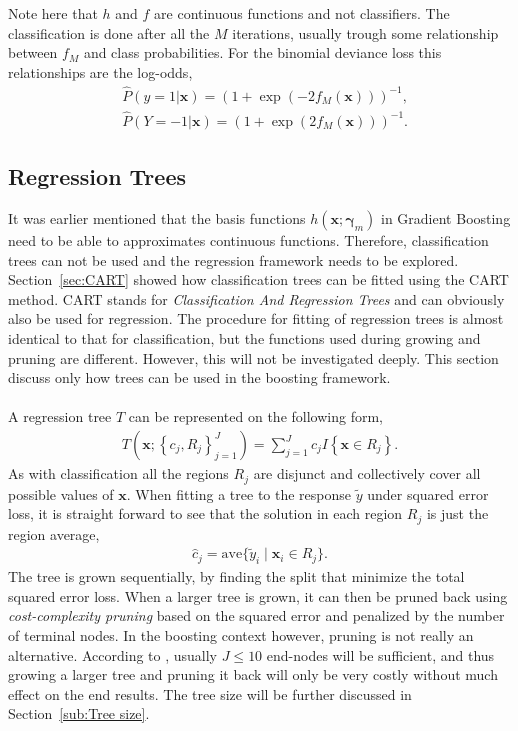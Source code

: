 Note here that $h$ and $f$ are continuous functions and not classifiers. The classification is done after all the $M$ iterations, usually trough some relationship between $f_M$ and class probabilities. For the binomial deviance loss this relationships are the log-odds,
\begin{align}
  \label{eq:boostLogOdds1} 
  &\hat P(y = 1 |  \mathbf{x}) = \left( 1+ \exp\left( -2 f_M (\mathbf{x}) \right) \right)^{-1},\\
  \label{eq:boostLogOdds2} 
  &\hat P(Y = -1 |  \mathbf{x}) = \left( 1+ \exp\left( 2 f_M (\mathbf{x}) \right) \right)^{-1}.
\end{align}
\subsection{Regression Trees}
\label{sub:Regression Trees}
It was earlier mentioned that the basis functions $h(\mathbf{x}; \bm{\gamma}_m)$ in Gradient Boosting need to be able to approximates continuous functions. Therefore, classification trees can not be used and the regression framework needs to be explored.
Section~\ref{sec:CART} showed how classification trees can be fitted using the CART method. CART stands for \textit{Classification And Regression Trees} and can obviously also be used for regression. The procedure for fitting of regression trees is almost identical to that for classification, but the functions used during growing and pruning are different. However, this will not be investigated deeply. This section discuss only how trees can be used in the boosting framework.\\
\\
A regression tree $T$ can be represented on the following form,
\begin{align}
  T(\mathbf{x}; \left\{ c_j, R_j \right\}_{j = 1}^J)  = \sum^{J}_{j=1} c_j I\left\{ \mathbf{x} \in R_j \right\}.
\end{align}
As with classification all the regions $R_j$ are disjunct and collectively cover all possible values of $\mathbf{x}$. 
When fitting a tree to the response $\tilde y$ under squared error loss, it is straight forward to see that the solution in each region $R_j$ is just the region average,
\begin{align}
  \hat{c}_j = \mathrm{ave}\{\tilde y_i \mid \mathbf{x}_i \in R_j\}.
\end{align}
The tree is grown sequentially, by finding the split that minimize the total squared error loss. When a larger tree is grown, it can then be pruned back using \textit{cost-complexity pruning} based on the squared error and penalized by the number of terminal nodes. In the boosting context however, pruning is not really an alternative. According to \cite{modstat}, usually $J \leq 10$ end-nodes will be sufficient, and thus growing a larger tree and pruning it back will only be very costly without much effect on the end results. The tree size will be further discussed in Section~\ref{sub:Tree size}.\\
